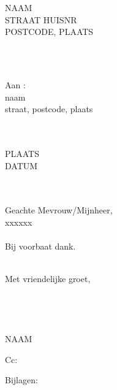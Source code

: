 \documentclass[a4paper,12pt]{article}
\begin{document}
\setlength{\parindent}{0em}
\pagestyle{empty}
\hfill
\begin{minipage}{0.3\textwidth}
NAAM \\ STRAAT HUISNR \\ POSTCODE, PLAATS
\end{minipage}
~\\~\\

\begin{minipage}{0.9\textwidth}
Aan : 
\\ naam \\ straat, postcode, plaats
~\\~\\~\\
\end{minipage}

\hfill
\begin{minipage}{0.3\textwidth}
PLAATS \\ DATUM
\end{minipage}
~\\~\\

Geachte Mevrouw/Mijnheer,
~\\

xxxxxx
~\\~\\

Bij voorbaat dank.
~\\~\\

\hspace*{0.3\textwidth}
\begin{minipage}{0.5\textwidth}
Met vriendelijke groet,
~\\~\\~\\~\\~\\
NAAM
\end{minipage}

\vfill
\begin{minipage}{0.8\textwidth}
Cc: 
\end{minipage}

\begin{minipage}{0.8\textwidth}
Bijlagen: 
\end{minipage}

\end{document}
